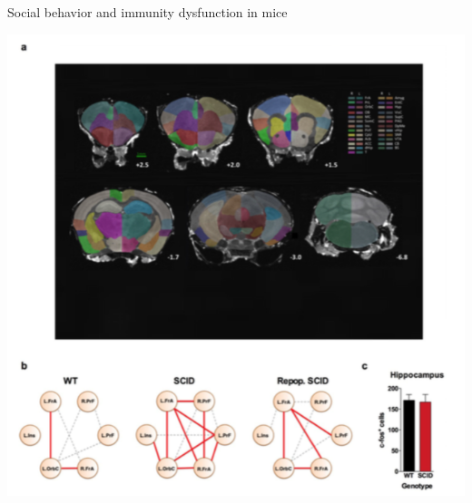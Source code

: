 \documentclass[ignorenonframetext,]{beamer}
\begin{document}
\begin{frame}{Social behavior and immunity dysfunction in mice}

\includegraphics{./antsr/figures/filiano_rsfmri.png}

\hypertarget{refs}{}

\end{frame}
\end{document}
